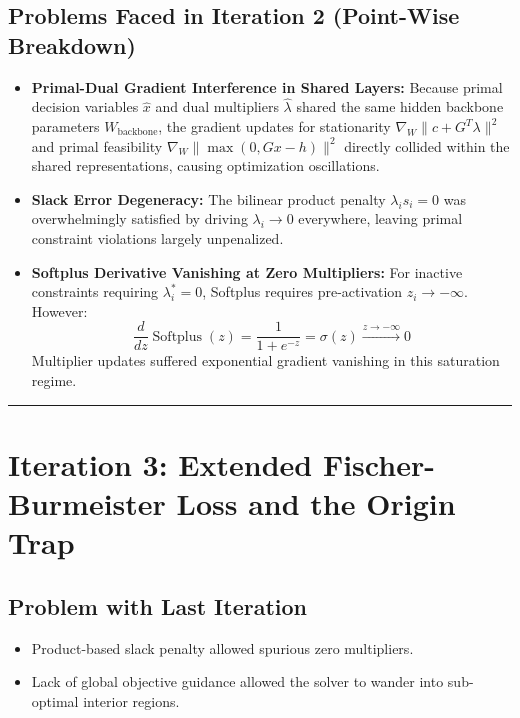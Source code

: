 \documentclass[11pt,a4paper]{article}
\begin{document}
\subsection{Problems Faced in Iteration 2 (Point-Wise Breakdown)}
\begin{itemize}[leftmargin=1.5em, itemsep=2pt]
    \item \textbf{Primal-Dual Gradient Interference in Shared Layers:} Because primal decision variables $\hat{x}$ and dual multipliers $\hat{\lambda}$ shared the same hidden backbone parameters $W_{\text{backbone}}$, the gradient updates for stationarity $\nabla_W \|c + G^T \lambda\|^2$ and primal feasibility $\nabla_W \|\max(0, Gx - h)\|^2$ directly collided within the shared representations, causing optimization oscillations.
    \item \textbf{Slack Error Degeneracy:} The bilinear product penalty $\lambda_i s_i = 0$ was overwhelmingly satisfied by driving $\lambda_i \to 0$ everywhere, leaving primal constraint violations largely unpenalized.
    \item \textbf{Softplus Derivative Vanishing at Zero Multipliers:} For inactive constraints requiring $\lambda_i^* = 0$, Softplus requires pre-activation $z_i \to -\infty$. However:
    \begin{equation}
        \frac{d}{dz} \operatorname{Softplus}(z) = \frac{1}{1 + e^{-z}} = \sigma(z) \xrightarrow{z \to -\infty} 0
    \end{equation}
    Multiplier updates suffered exponential gradient vanishing in this saturation regime.
\end{itemize}

\vspace{1em}
\hrule
\vspace{1.5em}

\section{Iteration 3: Extended Fischer-Burmeister Loss and the Origin Trap}

\subsection{Problem with Last Iteration}
\begin{itemize}[leftmargin=1.5em, itemsep=2pt]
    \item Product-based slack penalty allowed spurious zero multipliers.
    \item Lack of global objective guidance allowed the solver to wander into sub-optimal interior regions.
\end{itemize}
\end{document}
